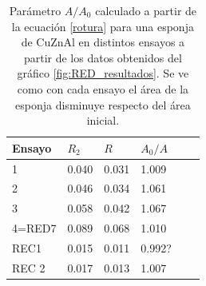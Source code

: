 \documentclass[a4paper,12pt,fleqn,twoside,openany]{book}
\begin{document}
% 
% 
% 
% 
%  


\begin{table} 
\begin{center} 
\begin{tabular}{@{}llllll@{}} \toprule
Ensayo   &    $R_2$    &  ${R}$ &  $A_0/A$ \\ \midrule
 1       &  0.040  & 0.031 & 1.009  \\
 2       &  0.046  & 0.034 &  1.061  \\
 3       &  0.058  & 0.042 &  1.067  \\
4=RED7     &  0.089  & 0.068 &  1.010 \\
REC1     &  0.015  & 0.011 &  0.992?   \\
REC 2    &  0.017  & 0.013 &  1.007   \\
\bottomrule
\end{tabular}
\caption{Parámetro $A/A_0$ calculado a partir de la ecuación \ref{rotura} para una esponja de CuZnAl en distintos ensayos a partir de los datos obtenidos del gráfico \ref{fig:RED_resultados}. Se ve como con cada ensayo el área de la esponja disminuye respecto del área inicial.}
\label{tab:A0Arotura}
\end{center}
\end{table}
 
\end{document}
